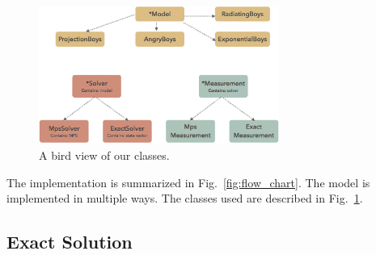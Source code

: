 \documentclass[english]{article}
\begin{document}
\begin{figure}[htbp]
\begin{center}
\includegraphics[width=0.7\textwidth]{class_diagram_new.pdf}
\caption{A bird view of our classes.}
\label{fig:class_diagram}
\end{center}
\end{figure}


The implementation is summarized in Fig.~\ref{fig:flow_chart}. The model is implemented in multiple ways. The classes used are described in Fig.~\ref{fig:class_diagram}.

\subsection{Exact Solution}


\end{document}
